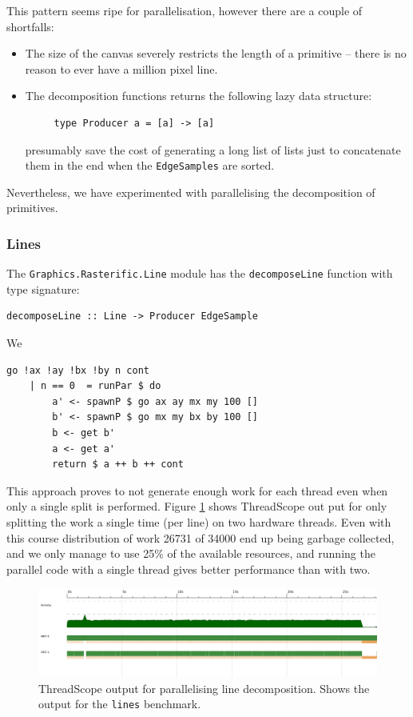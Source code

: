\documentclass[12pt, a4paper]{article}
\begin{document}
This pattern seems ripe for parallelisation, however there are a couple of shortfalls:
\begin{itemize}
\item The size of the canvas severely restricts the length of a primitive -- there is no reason to ever
   have a million pixel line.
 \item The decomposition functions returns the following lazy data structure:
   \begin{lstlisting}
     type Producer a = [a] -> [a]\end{lstlisting}
   presumably save the cost of generating a long list of lists just to concatenate them in the end
    when the \texttt{EdgeSamples} are sorted.
  \end{itemize}
  Nevertheless, we have experimented with parallelising the decomposition of primitives.

\subsubsection{Lines}
The \texttt{Graphics.Rasterific.Line} module has the \texttt{decomposeLine} function with type
signature:
\begin{lstlisting}
decomposeLine :: Line -> Producer EdgeSample\end{lstlisting}
We %
\begin{lstlisting}[caption={Naively splitting work in two parts}]
    go !ax !ay !bx !by n cont
    | n == 0  = runPar $ do
        a' <- spawnP $ go ax ay mx my 100 []
        b' <- spawnP $ go mx my bx by 100 []
        b <- get b'
        a <- get a'
        return $ a ++ b ++ cont
\end{lstlisting}
This approach proves to not generate enough work for each thread even when only a single split
is performed. Figure \ref{fig:line-thread} shows ThreadScope out put for only splitting the
work a single time (per line) on two hardware threads. Even with this course distribution of work
26731 of 34000 end up being garbage collected, and we only manage to use 25\% of the available
resources, and running the parallel code with a single thread gives better performance than with
two.
\begin{figure}[h!]
  \centering
  \includegraphics[width=0.85\linewidth]{../threadscope/lines/single-split}
  \caption{ThreadScope output for parallelising line decomposition. Shows the output for the
    \texttt{lines} benchmark.}
  \label{fig:line-thread}
\end{figure}
\end{document}
